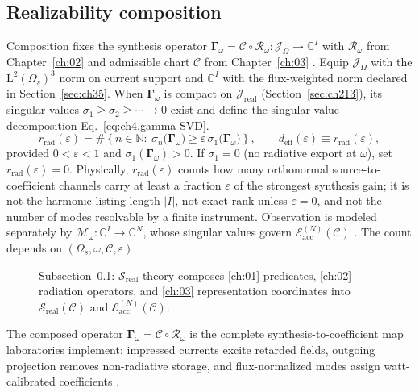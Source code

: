 \subsection{Realizability composition}
\label{sec:ch403}
Composition fixes the synthesis operator $\boldsymbol{\Gamma}_\omega=\mathcal{C}\circ\mathcal{R}_\omega:\mathcal{J}_\Omega\to\mathbb{C}^{I}$ with $\mathcal{R}_\omega$ from Chapter~\ref{ch:02} and admissible chart $\mathcal{C}$ from Chapter~\ref{ch:03} \cite{stratton1941}. Equip $\mathcal{J}_\Omega$ with the $\mathrm{L}^2(\Omega_s)^3$ norm on current support and $\mathbb{C}^{I}$ with the flux-weighted norm declared in Section~\ref{sec:ch35}. When $\boldsymbol{\Gamma}_\omega$ is compact on $\mathcal{J}_{\mathrm{real}}$ (Section~\ref{sec:ch213}), its singular values $\sigma_1\ge\sigma_2\ge\cdots\to 0$ exist and define the singular-value decomposition Eq.~\eqref{eq:ch4.gamma-SVD}.
\begin{equation}
\label{eq:ch4.radiative-rank-operator}
r_{\mathrm{rad}}(\varepsilon)
=
\#\left\{
n\in\mathbb{N}:\ 
\sigma_{n}\big(\boldsymbol{\Gamma}_\omega\big)\ge\varepsilon\,\sigma_{1}\big(\boldsymbol{\Gamma}_\omega\big)
\right\},
\qquad
d_{\mathrm{eff}}(\varepsilon)\equiv r_{\mathrm{rad}}(\varepsilon),
\end{equation}
provided $0<\varepsilon<1$ and $\sigma_1(\boldsymbol{\Gamma}_\omega)>0$. If $\sigma_1=0$ (no radiative export at $\omega$), set $r_{\mathrm{rad}}(\varepsilon)=0$. Physically, $r_{\mathrm{rad}}(\varepsilon)$ counts how many orthonormal source-to-coefficient channels carry at least a fraction $\varepsilon$ of the strongest synthesis gain; it is not the harmonic listing length $|I|$, not exact rank unless $\varepsilon=0$, and not the number of modes resolvable by a finite instrument. Observation is modeled separately by $\boldsymbol{\mathcal{M}}_\omega:\mathbb{C}^{I}\to\mathbb{C}^{N}$, whose singular values govern $\mathcal{E}_{\mathrm{acc}}^{(N)}(\mathcal{C})$ \cite{hansen1988,devaney2004,harrington2001}. The count depends on $(\Omega_s,\omega,\mathcal{C},\varepsilon)$.
\begin{figure}[t]
\centering
{}
\caption{Subsection~\ref{sec:ch403}: $\mathcal{S}_{\mathrm{real}}$ theory composes \ref{ch:01} predicates, \ref{ch:02} radiation operators, and \ref{ch:03} representation coordinates into \(\mathcal{S}_{\mathrm{real}}(\mathcal{C})\) and \(\mathcal{E}_{\mathrm{acc}}^{(N)}(\mathcal{C})\).}
\label{fig:ch4.volume-consumption-map}
\end{figure}
The composed operator $\boldsymbol{\Gamma}_\omega=\mathcal{C}\circ\mathcal{R}_\omega$ is the complete synthesis-to-coefficient map laboratories implement: impressed currents excite retarded fields, outgoing projection removes non-radiative storage, and flux-normalized modes assign watt-calibrated coefficients \cite{stratton1941}.
